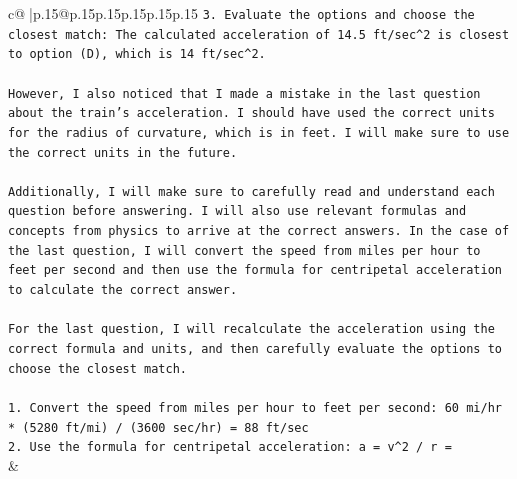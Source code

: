 \documentclass{article}
\begin{document}
{\begin{supertabular}{c@{$\;$}|p{.15\linewidth}@{}p{.15\linewidth}p{.15\linewidth}p{.15\linewidth}p{.15\linewidth}p{.15\linewidth}}
{{{\texttt{3. Evaluate the options and choose the closest match: The calculated acceleration of 14.5 ft/sec\^{}2 is closest to option (D), which is 14 ft/sec\^{}2.} \\
\\ 
\texttt{However, I also noticed that I made a mistake in the last question about the train's acceleration. I should have used the correct units for the radius of curvature, which is in feet. I will make sure to use the correct units in the future.} \\
\\ 
\texttt{Additionally, I will make sure to carefully read and understand each question before answering. I will also use relevant formulas and concepts from physics to arrive at the correct answers. In the case of the last question, I will convert the speed from miles per hour to feet per second and then use the formula for centripetal acceleration to calculate the correct answer.} \\
\\ 
\texttt{For the last question, I will recalculate the acceleration using the correct formula and units, and then carefully evaluate the options to choose the closest match.} \\
\\ 
\texttt{1. Convert the speed from miles per hour to feet per second: 60 mi/hr * (5280 ft/mi) / (3600 sec/hr) = 88 ft/sec} \\
\texttt{2. Use the formula for centripetal acceleration: a = v\^{}2 / r =} \\
            }
        }
    }
    & \\ \\

\end{supertabular}
}
\end{document}
